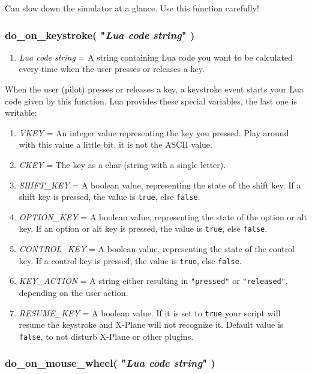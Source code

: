 \documentclass[11pt,parskip=half,a4paper]{scrartcl}
\begin{document}
Can slow down the simulator at a glance. Use this function carefully!

\subsubsection{do\_on\_keystroke( "\emph{Lua code string}" )}

\begin{enumerate}
	\item \emph{Lua code string} = A string containing Lua code you want to be calculated every time when the user presses or releases a key.
\end{enumerate}

When the user (pilot) presses or releases a key, a keystroke event starts your Lua code given by this function. Lua provides these special variables, the last one is writable:

\begin{enumerate}
	\item \emph{VKEY} = An integer value representing the key you pressed. Play around with this value a little bit, it is not the ASCII value.
	\item \emph{CKEY} = The key as a char (string with a single letter).
	\item \emph{SHIFT\_KEY} = A boolean value, representing the state of the shift key. If a shift key is pressed, the value is \verb|true|, else \verb|false|.
	\item \emph{OPTION\_KEY} = A boolean value, representing the state of the option or alt key. If an option or alt key is pressed, the value is \verb|true|, else \verb|false|.
	\item \emph{CONTROL\_KEY} = A boolean value, representing the state of the control key. If a control key is pressed, the value is \verb|true|, else \verb|false|.
	\item \emph{KEY\_ACTION} = A string either resulting in \verb|"pressed"| or \verb|"released"|, depending on the user action.
	\item \emph{RESUME\_KEY} = A boolean value. If it is set to \verb|true| your script will resume the keystroke and X-Plane will not recognize it. Default value is \verb|false|, to not disturb X-Plane or other plugins.
\end{enumerate}

\subsubsection{do\_on\_mouse\_wheel( "\emph{Lua code string}" )}
\end{document}
